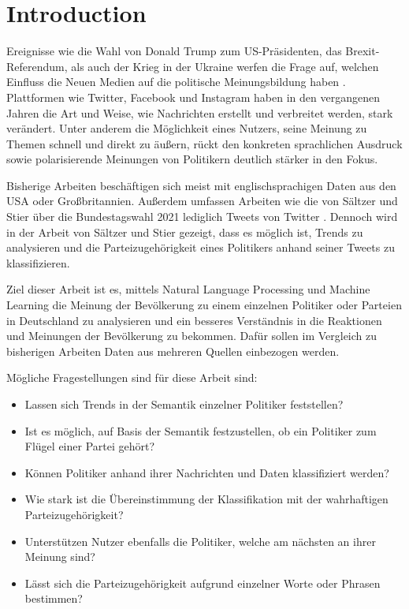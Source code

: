 
\chapter{Introduction} \label{ch:introduction}


Ereignisse wie die Wahl von Donald Trump zum US-Präsidenten, das Brexit-Referendum, als auch der Krieg in der Ukraine werfen die Frage auf, welchen Einfluss die Neuen Medien auf die politische Meinungsbildung haben \autocite{brandon_russia_2022, lee_how_2020}. Plattformen wie Twitter, Facebook und Instagram haben in den vergangenen Jahren die Art und Weise, wie Nachrichten erstellt und verbreitet werden, stark verändert. Unter anderem die Möglichkeit eines Nutzers, seine Meinung zu Themen schnell und direkt zu äußern, rückt den konkreten sprachlichen Ausdruck sowie polarisierende Meinungen von Politikern deutlich stärker in den Fokus.

Bisherige Arbeiten beschäftigen sich meist mit englischsprachigen Daten aus den USA oder Großbritannien. Außerdem umfassen Arbeiten wie die von Sältzer und Stier über die Bundestagswahl 2021 lediglich Tweets von Twitter \autocite{saltzer_bundestagswahl_2022}. Dennoch wird in der Arbeit von Sältzer und Stier gezeigt, dass es möglich ist, Trends zu analysieren und die Parteizugehörigkeit eines Politikers anhand seiner Tweets zu klassifizieren.

Ziel dieser Arbeit ist es, mittels Natural Language Processing und Machine Learning die Meinung der Bevölkerung zu einem einzelnen Politiker oder Parteien in Deutschland zu analysieren und ein besseres Verständnis in die Reaktionen und Meinungen der Bevölkerung zu bekommen. Dafür sollen im Vergleich zu bisherigen Arbeiten Daten aus mehreren Quellen einbezogen werden.

Mögliche Fragestellungen sind für diese Arbeit sind:

\begin{itemize}
    \item Lassen sich Trends in der Semantik einzelner Politiker feststellen?
    \item Ist es möglich, auf Basis der Semantik festzustellen, ob ein Politiker zum Flügel einer Partei gehört?
    \item Können Politiker anhand ihrer Nachrichten und Daten klassifiziert werden?
    \item Wie stark ist die Übereinstimmung der Klassifikation mit der wahrhaftigen Parteizugehörigkeit?
    \item Unterstützen Nutzer ebenfalls die Politiker, welche am nächsten an ihrer Meinung sind?
    \item Lässt sich die Parteizugehörigkeit aufgrund einzelner Worte oder Phrasen bestimmen?
\end{itemize}

